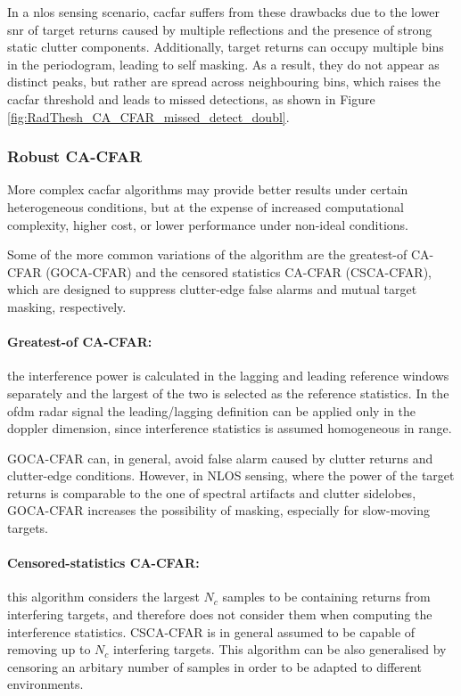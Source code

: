 	In a \gls{nlos} sensing scenario, \gls{cacfar} suffers from these drawbacks due to the lower \gls{snr} of target returns caused by multiple reflections and the presence of strong static clutter components.
	Additionally, target returns can occupy multiple bins in the periodogram, leading to self masking. 
	As a result, they do not appear as distinct peaks, but rather are spread across neighbouring bins, which raises the \gls{cacfar} threshold and leads to missed detections, as shown in Figure \ref{fig:RadThesh_CA_CFAR_missed_detect_doubl}.

\subsubsection{Robust CA-CFAR}
More complex \gls{cacfar} algorithms may provide better results under certain heterogeneous conditions, but at the expense of increased computational complexity, higher cost, or lower performance under non-ideal conditions.

Some of the more common variations of the algorithm are the greatest-of CA-CFAR (GOCA-CFAR) and the censored statistics CA-CFAR (CSCA-CFAR), which are designed to suppress clutter-edge false alarms and mutual target masking, respectively.

\paragraph{Greatest-of CA-CFAR:}
the interference power is calculated in the lagging and leading reference windows separately and the largest of the two is selected as the reference statistics. In the \gls{ofdm} radar signal the leading/lagging definition can be applied only in the doppler dimension, since interference statistics is assumed homogeneous in range.

GOCA-CFAR can, in general, avoid false alarm caused by clutter returns and clutter-edge conditions. However, in NLOS sensing, where the power of the target returns is comparable to the one of spectral artifacts and clutter sidelobes, GOCA-CFAR increases the possibility of masking, especially for slow-moving targets.
 
 
\paragraph{Censored-statistics CA-CFAR:}
this algorithm considers the largest $N_c$ samples to be containing returns from interfering targets, and therefore does not consider them when computing the interference statistics. CSCA-CFAR is in general assumed to be capable of removing up to $N_c$ interfering targets.
This algorithm can be also generalised by censoring an arbitary number of samples in order to be adapted to different environments. 

